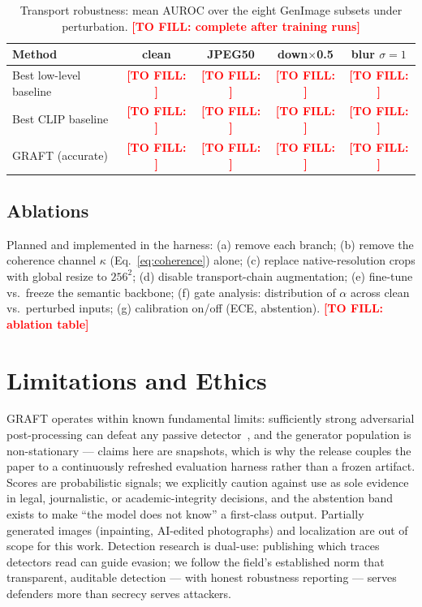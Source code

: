 \documentclass[10pt,twocolumn]{article}
\newcommand{\tofill}[1]{\textcolor{red}{\textbf{[TO FILL: #1]}}}
\begin{document}
\begin{table}[t]
\centering\small
\caption{Transport robustness: mean AUROC over the eight GenImage subsets
under perturbation. \tofill{complete after training runs}}
\begin{tabular}{l c c c c}
\hline
Method & clean & JPEG50 & down$\times$0.5 & blur $\sigma{=}1$ \\
\hline
Best low-level baseline & \tofill{} & \tofill{} & \tofill{} & \tofill{} \\
Best CLIP baseline      & \tofill{} & \tofill{} & \tofill{} & \tofill{} \\
GRAFT (accurate)        & \tofill{} & \tofill{} & \tofill{} & \tofill{} \\
\hline
\end{tabular}
\label{tab:robust}
\end{table}

\subsection{Ablations}
\label{sec:ablations}
Planned and implemented in the harness: (a) remove each branch;
(b) remove the coherence channel $\kappa$ (Eq.~\ref{eq:coherence}) alone;
(c) replace native-resolution crops with global resize to $256^2$;
(d) disable transport-chain augmentation; (e) fine-tune vs.\ freeze the
semantic backbone; (f) gate analysis: distribution of $\alpha$ across clean
vs.\ perturbed inputs; (g) calibration on/off (ECE, abstention).
\tofill{ablation table}

\section{Limitations and Ethics}
GRAFT operates within known fundamental limits: sufficiently strong
adversarial post-processing can defeat any passive
detector~\cite{saberi2024robustness}, and the generator population is
non-stationary --- claims here are snapshots, which is why the release
couples the paper to a continuously refreshed evaluation harness rather than
a frozen artifact. Scores are probabilistic signals; we explicitly caution
against use as sole evidence in legal, journalistic, or academic-integrity
decisions, and the abstention band exists to make ``the model does not know''
a first-class output. Partially generated images (inpainting, AI-edited
photographs) and localization are out of scope for this work. Detection
research is dual-use: publishing which traces detectors read can guide
evasion; we follow the field's established norm that transparent, auditable
detection --- with honest robustness reporting --- serves defenders more than
secrecy serves attackers.
\end{document}
